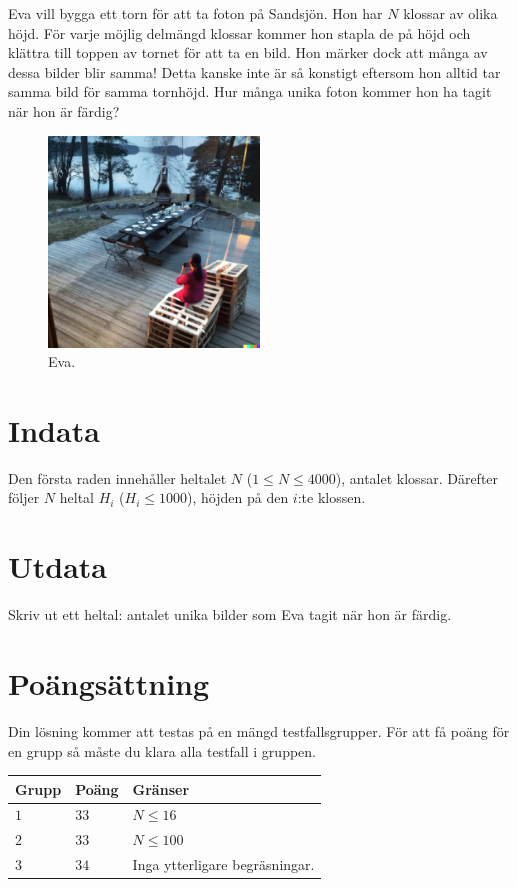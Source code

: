 Eva vill bygga ett torn för att ta foton på Sandsjön. Hon har $N$ klossar av olika höjd.
För varje möjlig delmängd klossar kommer hon stapla de på höjd och klättra till toppen av tornet
för att ta en bild. Hon märker dock att många av dessa bilder blir samma! Detta kanske inte är så konstigt eftersom hon alltid tar samma bild för samma tornhöjd. Hur många unika foton kommer hon ha tagit när hon är färdig? 

\begin{figure}
  \centering
    \includegraphics[width=0.5\textwidth]{eva.png}
  \caption{Eva.}
\end{figure}

\section*{Indata}
Den första raden innehåller heltalet $N$ ($1 \leq N \leq 4000$), antalet klossar.
Därefter följer $N$ heltal $H_i$ ($H_i \leq 1000$), höjden på den $i$:te klossen.
\section*{Utdata}
Skriv ut ett heltal: antalet unika bilder som Eva tagit när hon är färdig.

\section*{Poängsättning}
Din lösning kommer att testas på en mängd testfallsgrupper.
För att få poäng för en grupp så måste du klara alla testfall i gruppen.

\noindent
\begin{tabular}{| l | l | p{12cm} |}
  \hline
  \textbf{Grupp} & \textbf{Poäng} & \textbf{Gränser} \\ \hline
  $1$    & $33$      & $N \leq 16$ \\ \hline
  $2$    & $33$      & $N \leq 100$ \\ \hline
  $3$    & $34$      & Inga ytterligare begräsningar. \\ \hline
\end{tabular}

